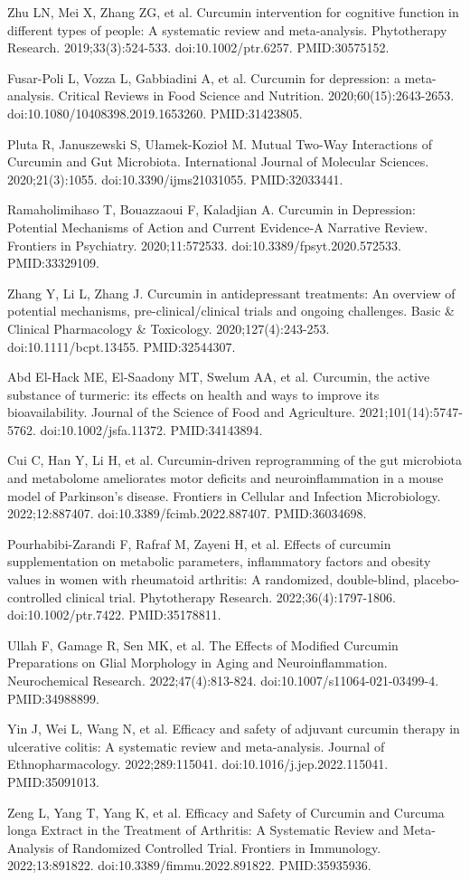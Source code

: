 \documentclass[11pt,oneside]{book}
\newcommand{\reff}[2]{\par\hangindent=7mm\hangafter=1\noindent[#1]\hspace{2mm}#2\par}
\begin{document}
\reff{11}{Zhu LN, Mei X, Zhang ZG, et al. Curcumin intervention for cognitive function in different types of people: A systematic review and meta-analysis. Phytotherapy Research. 2019;33(3):524-533. doi:10.1002/ptr.6257. PMID:30575152.}
\reff{12}{Fusar-Poli L, Vozza L, Gabbiadini A, et al. Curcumin for depression: a meta-analysis. Critical Reviews in Food Science and Nutrition. 2020;60(15):2643-2653. doi:10.1080/10408398.2019.1653260. PMID:31423805.}
\reff{13}{Pluta R, Januszewski S, Ułamek-Kozioł M. Mutual Two-Way Interactions of Curcumin and Gut Microbiota. International Journal of Molecular Sciences. 2020;21(3):1055. doi:10.3390/ijms21031055. PMID:32033441.}
\reff{14}{Ramaholimihaso T, Bouazzaoui F, Kaladjian A. Curcumin in Depression: Potential Mechanisms of Action and Current Evidence-A Narrative Review. Frontiers in Psychiatry. 2020;11:572533. doi:10.3389/fpsyt.2020.572533. PMID:33329109.}
\reff{15}{Zhang Y, Li L, Zhang J. Curcumin in antidepressant treatments: An overview of potential mechanisms, pre-clinical/clinical trials and ongoing challenges. Basic \& Clinical Pharmacology \& Toxicology. 2020;127(4):243-253. doi:10.1111/bcpt.13455. PMID:32544307.}
\reff{16}{Abd El-Hack ME, El-Saadony MT, Swelum AA, et al. Curcumin, the active substance of turmeric: its effects on health and ways to improve its bioavailability. Journal of the Science of Food and Agriculture. 2021;101(14):5747-5762. doi:10.1002/jsfa.11372. PMID:34143894.}
\reff{17}{Cui C, Han Y, Li H, et al. Curcumin-driven reprogramming of the gut microbiota and metabolome ameliorates motor deficits and neuroinflammation in a mouse model of Parkinson's disease. Frontiers in Cellular and Infection Microbiology. 2022;12:887407. doi:10.3389/fcimb.2022.887407. PMID:36034698.}
\reff{18}{Pourhabibi-Zarandi F, Rafraf M, Zayeni H, et al. Effects of curcumin supplementation on metabolic parameters, inflammatory factors and obesity values in women with rheumatoid arthritis: A randomized, double-blind, placebo-controlled clinical trial. Phytotherapy Research. 2022;36(4):1797-1806. doi:10.1002/ptr.7422. PMID:35178811.}
\reff{19}{Ullah F, Gamage R, Sen MK, et al. The Effects of Modified Curcumin Preparations on Glial Morphology in Aging and Neuroinflammation. Neurochemical Research. 2022;47(4):813-824. doi:10.1007/s11064-021-03499-4. PMID:34988899.}
\reff{20}{Yin J, Wei L, Wang N, et al. Efficacy and safety of adjuvant curcumin therapy in ulcerative colitis: A systematic review and meta-analysis. Journal of Ethnopharmacology. 2022;289:115041. doi:10.1016/j.jep.2022.115041. PMID:35091013.}
\reff{21}{Zeng L, Yang T, Yang K, et al. Efficacy and Safety of Curcumin and Curcuma longa Extract in the Treatment of Arthritis: A Systematic Review and Meta-Analysis of Randomized Controlled Trial. Frontiers in Immunology. 2022;13:891822. doi:10.3389/fimmu.2022.891822. PMID:35935936.}
\end{document}
